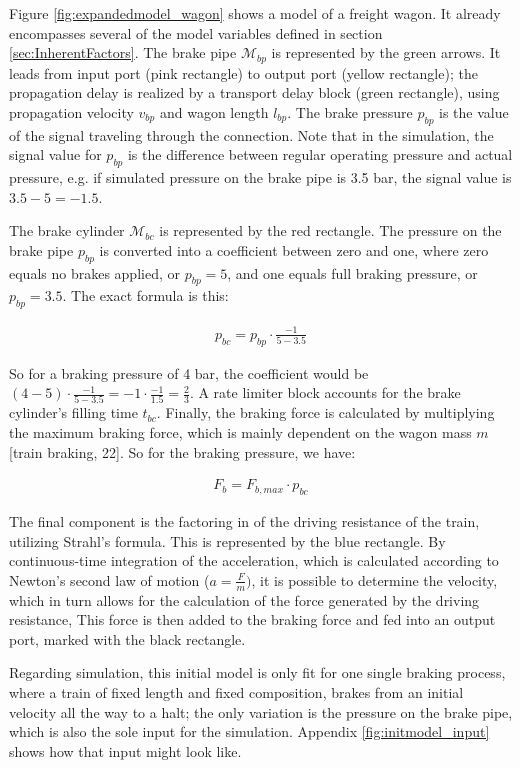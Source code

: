 \par\noindent
Figure \ref{fig:expandedmodel_wagon} shows a model of a freight wagon. It already encompasses several of the model variables defined in section \ref{sec:InherentFactors}. The brake pipe ${\mathcal{M}}_{bp}$ is represented by the green arrows. It leads from input port (pink rectangle) to output port (yellow rectangle); the propagation delay is realized by a transport delay block (green rectangle), using propagation velocity $v_{bp}$ and wagon length $l_{bp}$. The brake pressure $p_{bp}$ is the value of the signal traveling through the connection. Note that in the simulation, the signal value for $p_{bp}$ is the difference between regular operating pressure and actual pressure, e.g. if simulated pressure on the brake pipe is 3.5 bar, the signal value is $3.5 - 5 = -1.5$.
\par
The brake cylinder ${\mathcal{M}}_{bc}$ is represented by the red rectangle. The pressure on the brake pipe $p_{bp}$ is converted into a coefficient between zero and one, where zero equals no brakes applied, or $p_{bp} = 5$, and one equals full braking pressure, or $p_{bp} = 3.5$. The exact formula is this:

\begin{align*}
p_{bc} = p_{bp} \cdot \frac{-1}{5-3.5}
\end{align*}

\noindent
So for a braking pressure of 4 bar, the coefficient would be $(4 - 5) \cdot \frac{-1}{5-3.5} = -1 \cdot \frac{-1}{1.5} = \frac{2}{3}$. A rate limiter block accounts for the brake cylinder's filling time $t_{bc}$. Finally, the braking force is calculated by multiplying the maximum braking force, which is mainly dependent on the wagon mass $m$ [train braking, 22]. So for the braking pressure, we have:

\begin{align*}
F_{b} = F_{b,max} \cdot p_{bc}
\end{align*}

\noindent
The final component is the factoring in of the driving resistance of the train, utilizing Strahl's formula. This is represented by the blue rectangle. By continuous-time integration of the acceleration, which is calculated according to Newton's second law of motion ($a = \frac{F}{m})$, it is possible to determine the velocity, which in turn allows for the calculation of the force generated by the driving resistance, This force is then added to the braking force and fed into an output port, marked with the black rectangle.
\par
Regarding simulation, this initial model is only fit for one single braking process, where a train of fixed length and fixed composition, brakes from an initial velocity all the way to a halt; the only variation is the pressure on the brake pipe, which is also the sole input for the simulation. Appendix \ref{fig:initmodel_input} shows how that input might look like.


